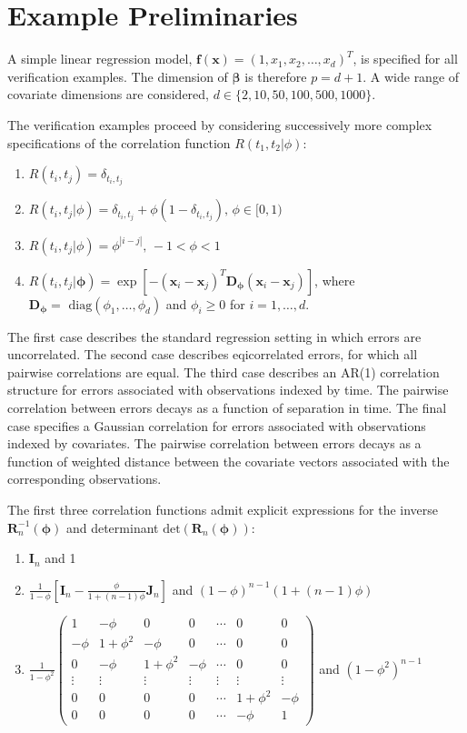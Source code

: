\documentclass[11pt, oneside]{article}   	%
\begin{document}
\section{Example Preliminaries}

A simple linear regression model, $\mathbf{f}(\mathbf{x}) = (1,x_1,x_2,\ldots,x_d)^T$, is specified for all verification examples.  The dimension of $\mathbf{\beta}$ is therefore $p=d+1$.  A wide range of covariate dimensions are considered, $d \in \{ 2, 10, 50, 100, 500, 1000 \}$.

The verification examples proceed by considering successively more complex specifications of the correlation function $R(t_1, t_2 | \phi)$:
\begin{enumerate}
\item $R(t_i, t_j ) = \delta_{t_i, t_j}$
\item $R(t_i, t_j | \phi) = \delta_{t_i, t_j}+\phi(1-\delta_{t_i,t_j}), \, \phi \in [0,1)$
\item $R(t_i,t_j | \phi) = \phi^{|i-j|}, \, -1 < \phi < 1$
\item $R(t_i,t_j | \mathbf{\phi}) = \exp \left[ -(\mathbf{x}_i - \mathbf{x}_j)^T \mathbf{D}_\mathbf{\phi} (\mathbf{x}_i - \mathbf{x}_j) \right]$, where $\mathbf{D}_\mathbf{\phi} = \mbox{ diag}(\phi_1, \ldots, \phi_d)$ and $\phi_i \ge 0$ for $i=1,\ldots, d$.
\end{enumerate}
The first case describes the standard regression setting in which errors are uncorrelated.  The second case describes eqicorrelated errors, for which all pairwise correlations are equal.  The third case describes an AR(1) correlation structure for errors associated with observations indexed by time.  The pairwise correlation between errors decays as a function of separation in time.  The final case specifies a Gaussian correlation for errors associated with observations indexed by covariates.  The pairwise correlation between errors decays as   a function of weighted distance between the covariate vectors associated with the corresponding observations.

The first three correlation functions admit explicit expressions for the inverse $\mathbf{R}_n^{-1}(\mathbf{\phi})$ and determinant $\mbox{det} \left( \mathbf{R}_n(\mathbf{\phi}) \right)$:
\begin{enumerate}
\item $\mathbf{I}_n$ and 1
\item $ \frac{1}{1-\phi} \left[ \mathbf{I}_n - \frac{\phi}{1+(n-1)\phi} \mathbf{J}_n \right]$ and $(1-\phi)^{n-1}(1+(n-1)\phi)$
\item $\frac{1}{1-\phi^2} \left(
\begin{array}{ccccccc}
1 & -\phi & 0 & 0 & \cdots & 0 & 0\\
-\phi & 1+\phi^2 & -\phi & 0 & \cdots & 0 & 0\\
0 & -\phi & 1+\phi^2 & -\phi & \cdots & 0 & 0\\
\vdots & \vdots & \vdots & \vdots & \vdots & \vdots & \vdots \\
0 & 0 & 0 & 0 & \cdots & 1+\phi^2 & -\phi \\
0 & 0 & 0 & 0 & \cdots & -\phi & 1
\end{array} \right)$ and $(1-\phi^2)^{n-1}$
\end{enumerate}
\end{document}
